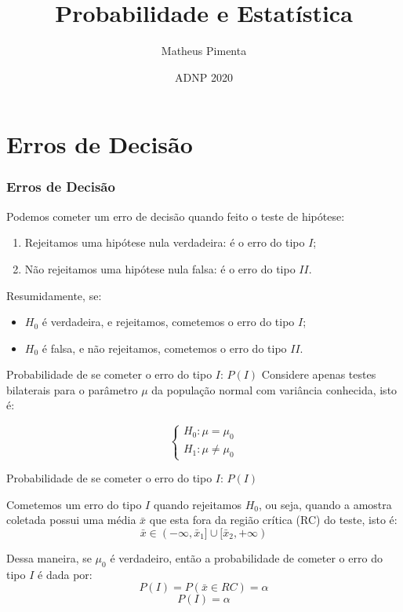 \documentclass[hyperref={pdfpagelabels=false}]{beamer}
\title{Probabilidade e Estatística}
\author[Matheus Pimenta]{Matheus Pimenta}
\institute[UTFPR-CP]{\normalsize Universidade Tecnológica Federal do Paraná \\
	Câmpus Cornélio Procópio
}
\date{ADNP 2020}
\begin{document}
	
\begin{frame}
\titlepage
\end{frame} 




\section{Erros de Decisão} 

\begin{frame}
\frametitle{Erros de Decisão}
Podemos cometer um erro de decisão quando feito o teste de hipótese: \pause
\begin{enumerate}
	\item Rejeitamos uma hipótese nula verdadeira: é o erro do tipo $I$; \pause
	\item Não rejeitamos uma hipótese nula falsa: é o erro do tipo $II$. \pause
\end{enumerate}

Resumidamente, se: \pause
\begin{itemize}
	\item $H_0$ é verdadeira, e rejeitamos, cometemos o erro do tipo $I$; \pause
	\item $H_0$ é falsa, e não rejeitamos, cometemos o erro do tipo $II$.
\end{itemize}
\end{frame}

\begin{frame}{Probabilidade de se cometer o erro do tipo $I$: $P(I)$}
Considere apenas testes bilaterais para o parâmetro $\mu$ da população normal com variância conhecida, isto é: \pause

$$\begin{cases}
H_0: \mu = \mu_0\\
H_1: \mu \neq \mu_0
\end{cases}$$

\end{frame}

\begin{frame}{Probabilidade de se cometer o erro do tipo $I$: $P(I)$}

Cometemos um erro do tipo $I$ quando rejeitamos $H_0$, ou seja, quando a amostra coletada possui uma média $\bar{x}$ que esta fora da região crítica (RC) do teste, isto é:
$$\bar{x} \in (-\infty,\bar{x}_1]\cup [\bar{x}_2,+\infty)$$ \pause

Dessa maneira, se $\mu_0$ é verdadeiro, então a probabilidade de cometer o erro do tipo $I$ é dada por:
$$P(I) = P(\bar{x} \in RC) = \alpha$$
$$P(I) = \alpha$$

\end{frame}
\end{document}
